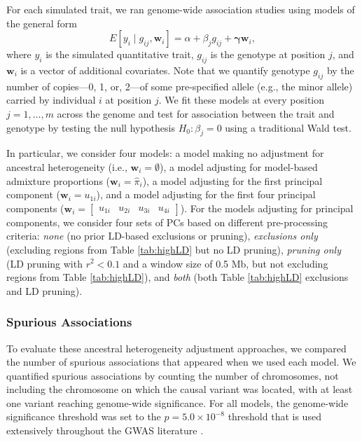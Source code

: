 \documentclass[12pt]{article}
\begin{document}
For each simulated trait, we ran genome-wide association studies using models of the general form
$$E[y_i \mid g_{ij}, \mathbf{w}_i] = \alpha + \beta_j g_{ij} + \boldsymbol\gamma \mathbf{w}_i,$$
where $y_i$ is the simulated quantitative trait, $g_{ij}$ is the genotype at position $j$,  and $\mathbf{w}_i$ is a vector of additional covariates.
Note that we quantify genotype $g_{ij}$ by the number of copies---0, 1, or, 2---of some pre-specified allele (e.g., the minor allele) carried by individual $i$ at position $j$.
We fit these models at every position $j = 1, \dots, m$ across the genome and test for association between the trait and genotype by testing the null hypothesis $H_0: \beta_j = 0$ using a traditional Wald test.

In particular, we consider four models: a model making no adjustment for ancestral heterogeneity (i.e., $\mathbf{w}_i = \emptyset$), a model adjusting for model-based admixture proportions ($\mathbf{w}_i = \hat\pi_i$), a model adjusting for the first principal component ($\mathbf{w}_i = u_{1i}$), and a model adjusting for the first four principal components ($\mathbf{w}_i = \begin{bmatrix} u_{1i} & u_{2i} & u_{3i} & u_{4i} \end{bmatrix}$). 
For the models adjusting for principal components, we consider four sets of PCs based on different pre-processing criteria: \textit{none} (no prior LD-based exclusions or pruning), \textit{exclusions only} (excluding regions from Table \ref{tab:highLD} but no LD pruning), \textit{pruning only} (LD pruning with $r^2 < 0.1$ and a window size of 0.5 Mb, but not excluding regions from Table \ref{tab:highLD}), and \textit{both} (both Table \ref{tab:highLD} exclusions and LD pruning).

\subsubsection{Spurious Associations}

To evaluate these ancestral heterogeneity adjustment approaches, we compared the number of spurious associations that appeared when we used each model.
We quantified spurious associations by counting the number of chromosomes, not including the chromosome on which the causal variant was located, with at least one variant reaching genome-wide significance.
For all models, the genome-wide significance threshold was set to the $p = 5.0 \times 10^{-8}$ threshold that is used extensively throughout the GWAS literature \cite{peer2008, jannot2015}.
\end{document}
